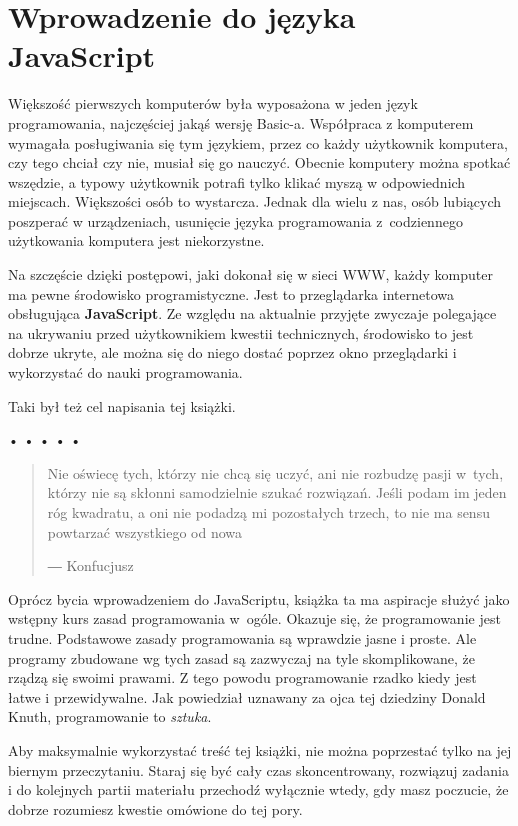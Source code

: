 \chapter{Wprowadzenie do języka JavaScript}
\label{chap:1}

Większość pierwszych komputerów była wyposażona w jeden język programowania, najczęściej jakąś wersję Basic-a. Współpraca z komputerem wymagała posługiwania się tym językiem, przez co każdy użytkownik komputera, czy tego chciał czy nie, musiał się go nauczyć. Obecnie komputery można spotkać wszędzie, a typowy użytkownik potrafi tylko klikać myszą w odpowiednich miejscach. Większości osób to wystarcza. Jednak dla wielu z nas, osób lubiących poszperać w urządzeniach, usunięcie języka programowania z~codziennego użytkowania komputera jest niekorzystne.

  
Na szczęście dzięki postępowi, jaki dokonał się w sieci WWW, każdy komputer ma pewne środowisko programistyczne. Jest to przeglądarka internetowa obsługująca \textbf{JavaScript}. Ze względu na aktualnie przyjęte zwyczaje polegające na ukrywaniu przed użytkownikiem kwestii technicznych, środowisko to jest dobrze ukryte, ale można się do niego dostać poprzez okno przeglądarki i wykorzystać do nauki programowania.

  
Taki był też cel napisania tej książki.


\begin{center}
• • • • •
\end{center}

  
\begin{quotation}
Nie oświecę tych, którzy nie chcą się uczyć, ani nie rozbudzę pasji w~tych, którzy nie są skłonni samodzielnie szukać rozwiązań. Jeśli podam im jeden róg kwadratu, a oni nie podadzą mi pozostałych trzech, to nie ma sensu powtarzać wszystkiego od nowa 
    
    ― Konfucjusz
\end{quotation}
  
Oprócz bycia wprowadzeniem do JavaScriptu, książka ta ma aspiracje służyć jako wstępny kurs zasad programowania w~ogóle. Okazuje się, że programowanie jest trudne. Podstawowe zasady programowania są wprawdzie jasne i proste. Ale programy zbudowane wg tych zasad są zazwyczaj na tyle skomplikowane, że rządzą się swoimi prawami. Z tego powodu programowanie rzadko kiedy jest łatwe i przewidywalne. Jak powiedział uznawany za ojca tej dziedziny Donald Knuth, programowanie to \emph{sztuka}.

  
Aby maksymalnie wykorzystać treść tej książki, nie można poprzestać tylko na jej biernym przeczytaniu. Staraj się być cały czas skoncentrowany, rozwiązuj zadania i do kolejnych partii materiału przechodź wyłącznie wtedy, gdy masz poczucie, że dobrze rozumiesz kwestie omówione do tej pory.



